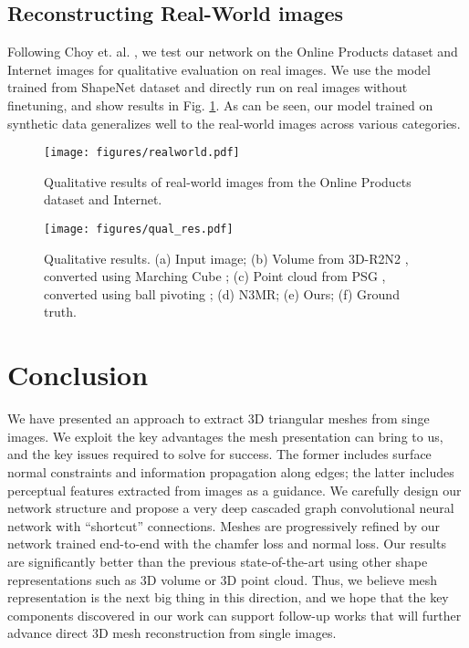 \documentclass[runningheads]{llncs}
\newcommand{\figref}[1]{Fig. \ref{#1}}
\begin{document}
\subsection{Reconstructing Real-World images}
Following Choy et. al. \cite{ChoyXGCS16}, we test our network on the Online Products dataset and Internet images for qualitative evaluation on real images. We use the model trained from ShapeNet dataset and directly run on real images without finetuning, and show results in \figref{fig:real}. As can be seen, our model trained on synthetic data generalizes well to the real-world images across various categories.


\begin{figure}[t]
\centering
\texttt{[image: figures/realworld.pdf]}
\caption{Qualitative results of real-world images from the Online Products dataset and Internet.}
\label{fig:real}
\end{figure}

\begin{figure}[t]
\centering
\texttt{[image: figures/qual\_res.pdf]}
\caption{Qualitative results. (a) Input image; (b) Volume from 3D-R2N2 \cite{ChoyXGCS16}, converted using Marching Cube \cite{LorensenC87}; (c) Point cloud from PSG \cite{FanSG16}, converted using ball pivoting \cite{BernardiniMRST99}; (d) N3MR\cite{KatoUH2018}; (e) Ours; (f) Ground truth.}
\label{fig:qual_res}
\end{figure}










 
\section{Conclusion}
\label{sec:con}
We have presented an approach to extract 3D triangular meshes from singe images. We exploit the key advantages the mesh presentation can bring to us, and the key issues required to solve for success. The former includes surface normal constraints and information propagation along edges; the latter includes perceptual features extracted from images as a guidance. We carefully design our network structure and propose a very deep cascaded graph convolutional neural network with ``shortcut'' connections. Meshes are progressively refined by our network trained end-to-end with the chamfer loss and normal loss.
Our results are significantly better than the previous state-of-the-art using other shape representations such as 3D volume or 3D point cloud. Thus, we believe mesh representation is the next big thing in this direction, and
we hope that the key components discovered in our work can support follow-up works that will further advance direct 3D mesh reconstruction from single images.
\end{document}
